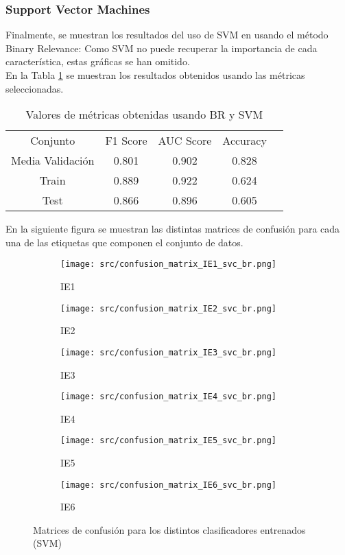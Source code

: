 \subsubsection*{Support Vector Machines}
Finalmente, se muestran los resultados del uso de SVM en usando el método Binary Relevance:
Como SVM no puede recuperar la importancia de cada característica, estas gráficas se han omitido.\\
\linebreak
En la Tabla \ref{tab:ml_tab_svc} se muestran los resultados obtenidos usando las métricas seleccionadas.
\begin{table}[H]
	\centering
	\begin{tabular}{|c|c|c|c|c}
		\cline{1-4}
		Conjunto         & F1 Score & AUC Score & Accuracy \\ \cline{1-4}
		Media Validación & 0.801    & 0.902     & 0.828    \\ \cline{1-4}
		Train            & 0.889    & 0.922     & 0.624    \\ \cline{1-4}
		Test             & 0.866    & 0.896     & 0.605    \\ \cline{1-4}
	\end{tabular}
	\caption{Valores de métricas obtenidas usando BR y SVM}
	\label{tab:ml_tab_svc}
\end{table}
En la siguiente figura se muestran las distintas matrices de confusión para cada una de las etiquetas que componen el conjunto de datos.
\begin{figure}[H]
	\centering
	\begin{subfigure}[b]{0.3\textwidth}
		\centering
		\texttt{[image: src/confusion\_matrix\_IE1\_svc\_br.png]}
		\caption{IE1}
	\end{subfigure}
	\hfill
	\begin{subfigure}[b]{0.3\textwidth}
		\centering
		\texttt{[image: src/confusion\_matrix\_IE2\_svc\_br.png]}
		\caption{IE2}
	\end{subfigure}
	\hfill
	\begin{subfigure}[b]{0.3\textwidth}
		\centering
		\texttt{[image: src/confusion\_matrix\_IE3\_svc\_br.png]}
		\caption{IE3}
	\end{subfigure}
	\hfill
	\begin{subfigure}[b]{0.3\textwidth}
		\centering
		\texttt{[image: src/confusion\_matrix\_IE4\_svc\_br.png]}
		\caption{IE4}
	\end{subfigure}
	\hfill
	\begin{subfigure}[b]{0.3\textwidth}
		\centering
		\texttt{[image: src/confusion\_matrix\_IE5\_svc\_br.png]}
		\caption{IE5}
	\end{subfigure}
	\hfill
	\begin{subfigure}[b]{0.3\textwidth}
		\centering
		\texttt{[image: src/confusion\_matrix\_IE6\_svc\_br.png]}
		\caption{IE6}
	\end{subfigure}
	\caption{Matrices de confusión para los distintos clasificadores entrenados (SVM)}
	\label{fig:ml_conf_matrix_svc}
\end{figure}
